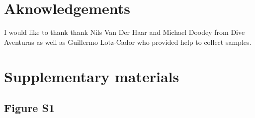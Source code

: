 \documentclass[fleqn,10pt,lineno]{wlpeerj} %
\begin{document}
\section{Aknowledgements}\label{aknowledgements}

I would like to thank thank Nils Van Der Haar and Michael Doodey from
Dive Aventuras as well as Guillermo Lotz-Cador who provided help to
collect samples.



\section{Supplementary materials}\label{supplementary-materials}

\subsection{Figure S1}\label{figure-s1}
\end{document}
